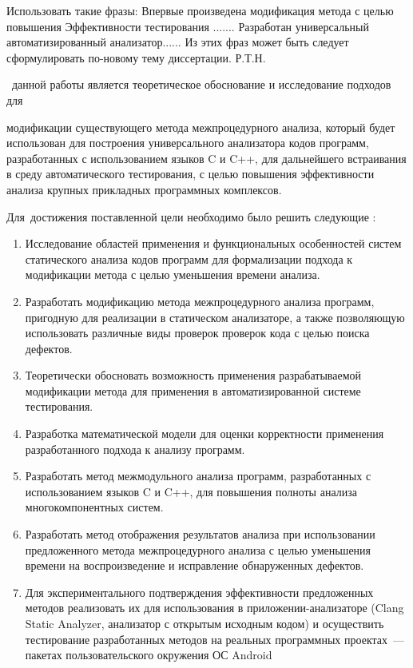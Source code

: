   Использовать такие фразы:
  Впервые произведена модификация метода с целью повышения Эффективности  тестирования ....... 
Разработан универсальный автоматизированный анализатор......
Из этих фраз может быть следует сформулировать по-новому тему диссертации.
   Р.Т.Н. 
   
   
   
\aim\ данной работы является теоретическое обоснование и исследование подходов для {модификации существующего метода межпроцедурного анализа, который будет использован для построения универсального анализатора кодов программ, разработанных с использованием языков C и C++, для дальнейшего встраивания в среду автоматического тестирования, с целью повышения эффективности анализа крупных прикладных программных комплексов. %

Для~достижения поставленной цели необходимо было решить следующие {\tasks}:
\begin{enumerate}
  \item Исследование областей применения и функциональных особенностей систем статического анализа кодов программ для формализации подхода к модификации метода с целью уменьшения времени анализа.
  \item Разработать модификацию метода межпроцедурного анализа программ, пригодную для реализации в  статическом анализаторе, а также позволяющую использовать различные виды проверок проверок кода с целью поиска дефектов.
  \item Теоретически обосновать возможность применения разрабатываемой модификации метода для применения в автоматизированной системе тестирования.
  \item Разработка математической модели для оценки корректности применения разработанного подхода к анализу программ.
  \item Разработать метод межмодульного анализа программ, разработанных с использованием языков C и C++, для повышения полноты анализа многокомпонентных систем.
  \item Разработать метод отображения результатов анализа при использовании предложенного метода межпроцедурного анализа с целью уменьшения времени на воспроизведение и исправление обнаруженных дефектов.
  \item Для экспериментального подтверждения эффективности предложенных методов реализовать их для использования в приложении-анализаторе (Clang Static Analyzer, анализатор с открытым исходным кодом) и осуществить тестирование разработанных методов на реальных программных проектах~--- пакетах пользовательского окружения ОС Android
\end{enumerate}

}
